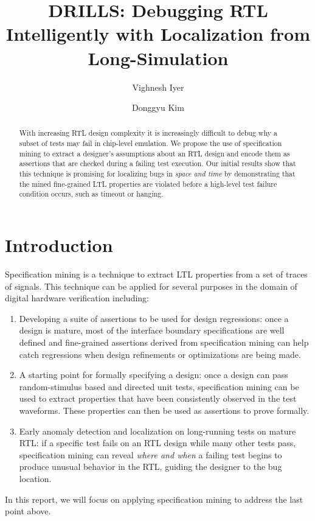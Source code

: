 \documentclass[acmlarge,11pt]{acmart}
\begin{document}
\title{DRILLS: Debugging RTL Intelligently with Localization from Long-Simulation}
\author{Vighnesh Iyer}
\author{Donggyu Kim}
\renewcommand{\shortauthors}{Iyer and Kim}

\begin{abstract}
  With increasing RTL design complexity it is increasingly difficult to debug why a subset of tests may fail in chip-level emulation.
  We propose the use of specification mining to extract a designer's assumptions about an RTL design and encode them as assertions that are checked during a failing test execution.
  Our initial results show that this technique is promising for localizing bugs in \textit{space and time} by demonstrating that the mined fine-grained LTL properties are violated before a high-level test failure condition occurs, such as timeout or hanging.
\end{abstract}
\maketitle
\thispagestyle{empty}
\section{Introduction}
Specification mining is a technique to extract LTL properties from a set of traces of signals.
This technique can be applied for several purposes in the domain of digital hardware verification including:
\begin{enumerate}
  \item Developing a suite of assertions to be used for design regressions: once a design is mature, most of the interface boundary specifications are well defined and fine-grained assertions derived from specification mining can help catch regressions when design refinements or optimizations are being made.
  \item A starting point for formally specifying a design: once a design can pass random-stimulus based and directed unit tests, specification mining can be used to extract properties that have been consistently observed in the test waveforms. These properties can then be used as assertions to prove formally.
  \item Early anomaly detection and localization on long-running tests on mature RTL: if a specific test fails on an RTL design while many other tests pass, specification mining can reveal \textit{where and when} a failing test begins to produce unusual behavior in the RTL, guiding the designer to the bug location.
\end{enumerate}
In this report, we will focus on applying specification mining to address the last point above.
\end{document}
